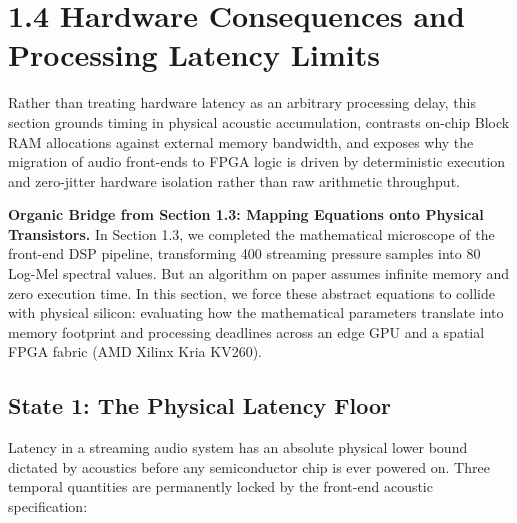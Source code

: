 \documentclass[11pt,a4paper]{article}
\begin{document}
\vspace*{-4.5mm}
\section*{1.4 Hardware Consequences and Processing Latency Limits}
\vspace{-2.5mm}

\begin{learningobj}
Rather than treating hardware latency as an arbitrary processing delay, this section grounds timing in physical acoustic accumulation, contrasts on-chip Block RAM allocations against external memory bandwidth, and exposes why the migration of audio front-ends to FPGA logic is driven by deterministic execution and zero-jitter hardware isolation rather than raw arithmetic throughput.
\end{learningobj}

\vspace{0.5mm}
\noindent\textbf{Organic Bridge from Section 1.3: Mapping Equations onto Physical Transistors.} In Section 1.3, we completed the mathematical microscope of the front-end DSP pipeline, transforming 400 streaming pressure samples into 80 Log-Mel spectral values. But an algorithm on paper assumes infinite memory and zero execution time. In this section, we force these abstract equations to collide with physical silicon: evaluating how the mathematical parameters translate into memory footprint and processing deadlines across an edge GPU and a spatial FPGA fabric (AMD Xilinx Kria KV260).

\vspace{-1.5mm}
\subsection*{State 1: The Physical Latency Floor}
\vspace{-2mm}

Latency in a streaming audio system has an absolute physical lower bound dictated by acoustics before any semiconductor chip is ever powered on. Three temporal quantities are permanently locked by the front-end acoustic specification:
\end{document}
